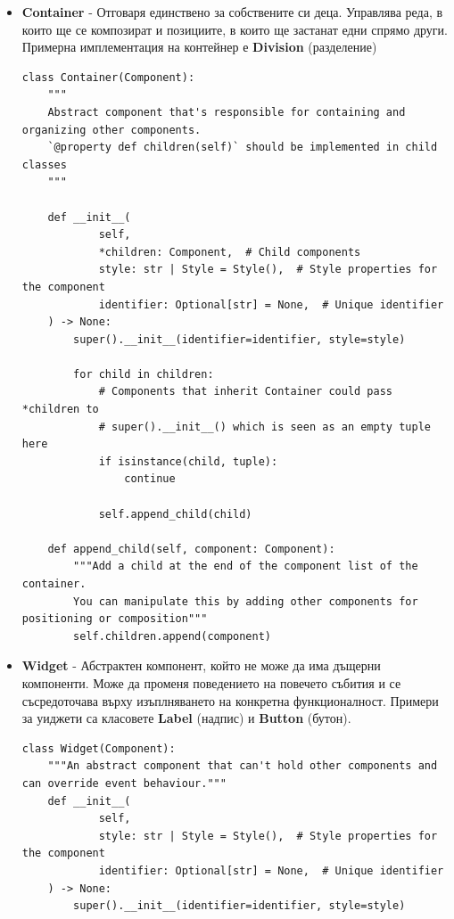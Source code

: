         \begin{itemize}
                \item \textbf{Container} - Отговаря единствено за собствените 
                        си деца. Управлява реда, в които ще се композират и
                        позициите, в които ще застанат едни спрямо други.
                        Примерна имплементация на контейнер е \textbf{Division}
                        (разделение)
                        \vspace{5mm}
                        \begin{lstlisting}[style=py]
class Container(Component):
    """
    Abstract component that's responsible for containing and organizing other components.
    `@property def children(self)` should be implemented in child classes
    """

    def __init__(
            self,
            *children: Component,  # Child components
            style: str | Style = Style(),  # Style properties for the component
            identifier: Optional[str] = None,  # Unique identifier
    ) -> None:
        super().__init__(identifier=identifier, style=style)

        for child in children:
            # Components that inherit Container could pass *children to
            # super().__init__() which is seen as an empty tuple here
            if isinstance(child, tuple):
                continue

            self.append_child(child)

    def append_child(self, component: Component):
        """Add a child at the end of the component list of the container.
        You can manipulate this by adding other components for positioning or composition"""
        self.children.append(component)
                        \end{lstlisting}
                \vspace{5mm}
                \item \textbf{Widget} - Абстрактен компонент, който не може да
                        има дъщерни компоненти. Може да променя поведението на 
                        повечето събития и се съсредоточава върху изъплняването
                        на конкретна функционалност. Примери за уиджети са 
                        класовете \textbf{Label} (надпис) и \textbf{Button}
                        (бутон).

                        \vspace{11mm}
                        \begin{lstlisting}[style=py]
class Widget(Component):
    """An abstract component that can't hold other components and can override event behaviour."""
    def __init__(
            self,
            style: str | Style = Style(),  # Style properties for the component
            identifier: Optional[str] = None,  # Unique identifier
    ) -> None:
        super().__init__(identifier=identifier, style=style)


\end{lstlisting}
\end{itemize}
